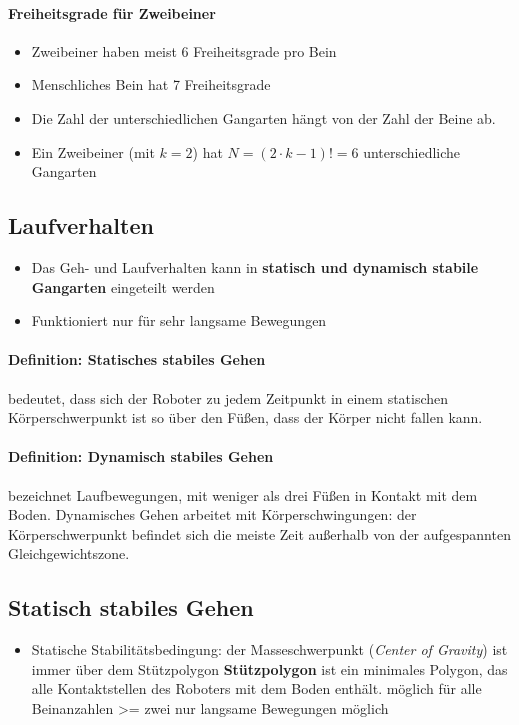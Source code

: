 \paragraph{Freiheitsgrade für Zweibeiner}
\begin{itemize}
	\item Zweibeiner haben meist 6 Freiheitsgrade pro Bein
	\item Menschliches Bein hat 7 Freiheitsgrade
	\item Die Zahl der unterschiedlichen Gangarten hängt von der Zahl der Beine
		ab.
	\item Ein Zweibeiner (mit $k=2$) hat $N = (2 \cdot k - 1)! = 6$
		unterschiedliche Gangarten
\end{itemize}
\subsection{Laufverhalten}
\begin{itemize}
	\item Das Geh- und Laufverhalten kann in \textbf{statisch und dynamisch stabile Gangarten} eingeteilt werden
	\item Funktioniert nur für sehr langsame Bewegungen
\end{itemize}
\paragraph{Definition: Statisches stabiles Gehen}
bedeutet, dass sich der Roboter zu jedem Zeitpunkt in einem statischen Körperschwerpunkt ist so über den Füßen, dass der Körper nicht fallen kann.
\paragraph{Definition: Dynamisch stabiles Gehen}
bezeichnet Laufbewegungen, mit weniger als drei Füßen in Kontakt mit dem Boden.
Dynamisches Gehen arbeitet mit Körperschwingungen: der Körperschwerpunkt befindet sich die meiste Zeit außerhalb von der aufgespannten Gleichgewichtszone.
\subsection{Statisch stabiles Gehen}
\begin{itemize}
	\item Statische Stabilitätsbedingung: der Masseschwerpunkt (\textit{Center of Gravity}) ist immer über dem Stützpolygon
	\subitem \textbf{Stützpolygon} ist ein minimales Polygon, das alle Kontaktstellen des Roboters mit dem Boden enthält.
	\subitem möglich für alle Beinanzahlen >= zwei
	\subitem nur langsame Bewegungen möglich
\end{itemize}
